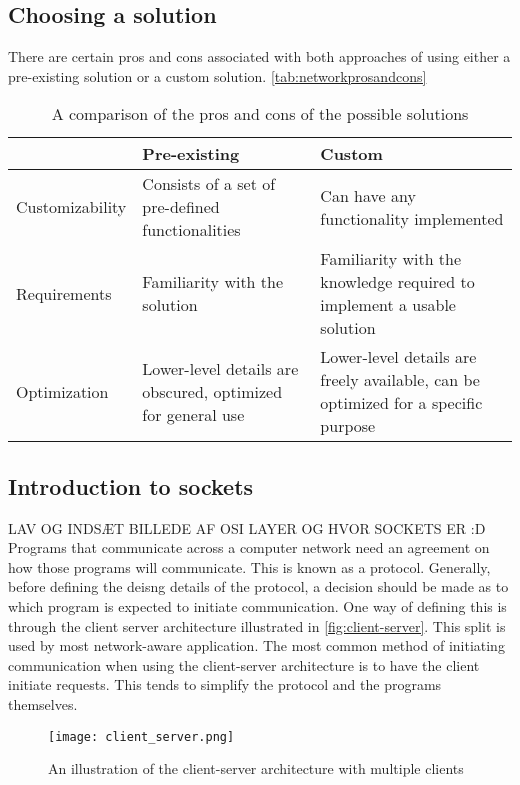 \subsection{Choosing a solution}
There are certain pros and cons associated with both approaches of using either a pre-existing solution or a custom solution.
\autoref{tab:networkprosandcons} 
\begin{table}[]
    \begin{tabular}{|l|l|l|}
    \hline
                    & Pre-existing                                                & Custom                                                                            \\ \hline
    Customizability & Consists of a set of pre-defined functionalities            & Can have any functionality implemented                                            \\ \hline
    Requirements    & Familiarity with the solution                               & Familiarity with the knowledge required to implement a usable solution            \\ \hline
    Optimization    & Lower-level details are obscured, optimized for general use & Lower-level details are freely available, can be optimized for a specific purpose \\ \hline
    \end{tabular}
    \caption{A comparison of the pros and cons of the possible solutions}
    \label{tab:networkprosandcons}
    \end{table}

\subsection{Introduction to sockets}
LAV OG INDSÆT BILLEDE AF OSI LAYER OG HVOR SOCKETS ER :D
Programs that communicate across a computer network need an agreement on how those programs will communicate.
This is known as a protocol.
Generally, before defining the deisng details of the protocol, a decision should be made as to which program is expected to initiate communication.
One way of defining this is through the client server architecture illustrated in \autoref{fig:client-server}.
This split is used by most network-aware application\cite{socketnetworking}.
The most common method of initiating communication when using the client-server architecture is to have the client initiate requests.
This tends to simplify the protocol and the programs themselves\cite{socketnetworking}.



\begin{figure}[H]
    \centering
    \texttt{[image: client\_server.png]}
    \caption{An illustration of the client-server architecture with multiple clients}
    \label{fig:client-server}
\end{figure}

